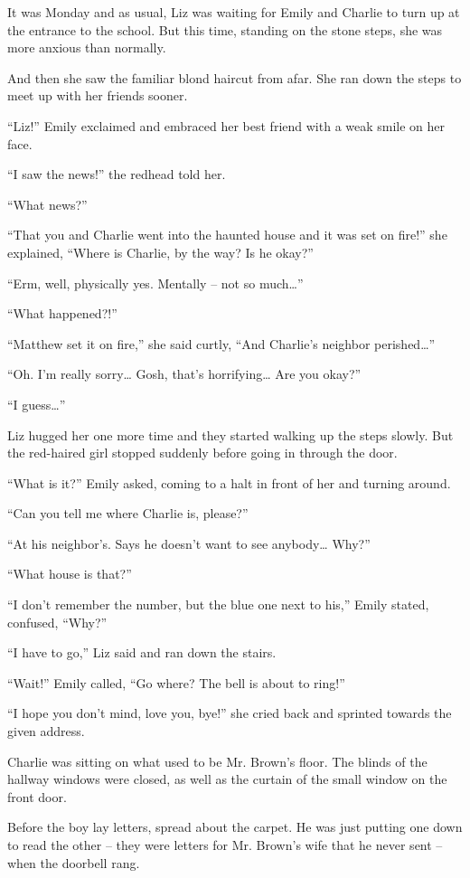 It was Monday and as usual, Liz was waiting for Emily and Charlie to turn up at the entrance to the school. But this time, standing on the stone steps, she was more anxious than normally.

And then she saw the familiar blond haircut from afar. She ran down the steps to meet up with her friends sooner.

“Liz!” Emily exclaimed and embraced her best friend with a weak smile on her face.

“I saw the news!” the redhead told her.

“What news?”

“That you and Charlie went into the haunted house and it was set on fire!” she explained, “Where is Charlie, by the way? Is he okay?”

“Erm, well, physically yes. Mentally – not so much…”

“What happened?!”

“Matthew set it on fire,” she said curtly, “And Charlie's neighbor perished…”

“Oh. I'm really sorry… Gosh, that's horrifying… Are you okay?”

“I guess…”

Liz hugged her one more time and they started walking up the steps slowly. But the red-haired girl stopped suddenly before going in through the door.

“What is it?” Emily asked, coming to a halt in front of her and turning around.

“Can you tell me where Charlie is, please?”

“At his neighbor's. Says he doesn't want to see anybody… Why?”

“What house is that?”

“I don't remember the number, but the blue one next to his,” Emily stated, confused, “Why?”

“I have to go,” Liz said and ran down the stairs.

“Wait!” Emily called, “Go where? The bell is about to ring!”

“I hope you don't mind, love you, bye!” she cried back and sprinted towards the given address.

\bigskip

Charlie was sitting on what used to be Mr. Brown's floor. The blinds of the hallway windows were closed, as well as the curtain of the small window on the front door.

Before the boy lay letters, spread about the carpet. He was just putting one down to read the other – they were letters for Mr. Brown's wife that he never sent – when the doorbell rang.

